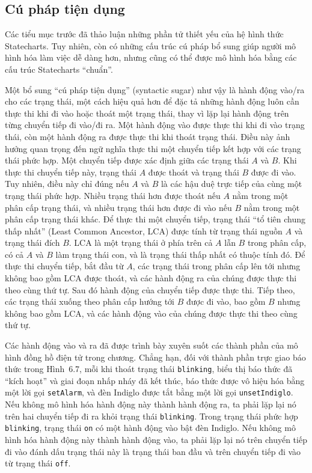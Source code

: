 
\subsection{Cú pháp tiện dụng}
Các tiểu mục trước đã thảo luận những phần tử thiết yếu của hệ hình thức Statecharts. Tuy nhiên, còn có những cấu trúc cú pháp bổ sung giúp người mô hình hóa làm việc dễ dàng hơn, nhưng cũng có thể được mô hình hóa bằng các cấu trúc Statecharts ``chuẩn''.

Một bổ sung ``cú pháp tiện dụng'' (syntactic sugar) như vậy là hành động vào/ra cho các trạng thái, một cách hiệu quả hơn để đặc tả những hành động luôn cần thực thi khi đi vào hoặc thoát một trạng thái, thay vì lặp lại hành động trên từng chuyển tiếp đi vào/đi ra. Một hành động vào được thực thi khi đi vào trạng thái, còn một hành động ra được thực thi khi thoát trạng thái. Điều này ảnh hưởng quan trọng đến ngữ nghĩa thực thi một chuyển tiếp kết hợp với các trạng thái phức hợp. Một chuyển tiếp được xác định giữa các trạng thái $A$ và $B$. Khi thực thi chuyển tiếp này, trạng thái $A$ được thoát và trạng thái $B$ được đi vào. Tuy nhiên, điều này chỉ đúng nếu $A$ và $B$ là các hậu duệ trực tiếp của cùng một trạng thái phức hợp. Nhiều trạng thái hơn được thoát nếu $A$ nằm trong một phân cấp trạng thái, và nhiều trạng thái hơn được đi vào nếu $B$ nằm trong một phân cấp trạng thái khác. Để thực thi một chuyển tiếp, trạng thái ``tổ tiên chung thấp nhất'' (Least Common Ancestor, LCA) được tính từ trạng thái nguồn $A$ và trạng thái đích $B$. LCA là một trạng thái ở phía trên cả $A$ lẫn $B$ trong phân cấp, có cả $A$ và $B$ làm trạng thái con, và là trạng thái thấp nhất có thuộc tính đó. Để thực thi chuyển tiếp, bắt đầu từ $A$, các trạng thái trong phân cấp lên tới nhưng không bao gồm LCA được thoát, và các hành động ra của chúng được thực thi theo cùng thứ tự. Sau đó hành động của chuyển tiếp được thực thi. Tiếp theo, các trạng thái xuống theo phân cấp hướng tới $B$ được đi vào, bao gồm $B$ nhưng không bao gồm LCA, và các hành động vào của chúng được thực thi theo cùng thứ tự.

Các hành động vào và ra đã được trình bày xuyên suốt các thành phần của mô hình đồng hồ điện tử trong chương. Chẳng hạn, đối với thành phần trực giao báo thức trong Hình~6.7, mỗi khi thoát trạng thái \texttt{blinking}, biểu thị báo thức đã ``kích hoạt'' và giai đoạn nhấp nháy đã kết thúc, báo thức được vô hiệu hóa bằng một lời gọi \texttt{setAlarm}, và đèn Indiglo được tắt bằng một lời gọi \texttt{unsetIndiglo}. Nếu không mô hình hóa hành động này thành hành động ra, ta phải lặp lại nó trên hai chuyển tiếp đi ra khỏi trạng thái \texttt{blinking}. Trong trạng thái phức hợp \texttt{blinking}, trạng thái \texttt{on} có một hành động vào bật đèn Indiglo. Nếu không mô hình hóa hành động này thành hành động vào, ta phải lặp lại nó trên chuyển tiếp đi vào đánh dấu trạng thái này là trạng thái ban đầu và trên chuyển tiếp đi vào từ trạng thái \texttt{off}.


